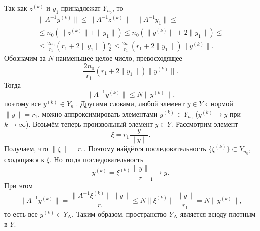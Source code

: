 \documentclass[12pt,a4paper, titlepage]{article}
\begin{document}
Так как $z^{(k)}$ и $y_1$ принадлежат $Y_{n_0}$, то
\begin{multline*}
\|A^{-1} y^{(k)}\| \leqslant \|A^{-1} z^{(k)}\| + \|A^{-1} y_1\| \leqslant \\
\leqslant n_0(\|z^{(k)}\| + \|y_1\|) \leqslant n_0(\|y^{(k)}\| + 2\|y_1\|) \leqslant \\
\leqslant \frac {2n_0} {r_1} (r_1 + 2\|y_1\|) \frac {r_1} 2 \leqslant \frac {2n_0} {r_1} (r_1 + 2 \|y_1\|) \|y^{(k)}\|.
\end{multline*}
Обозначим за $N$ наименьшее целое число, превосходящее
$$
\frac {2n_0} {r_1} (r_1 + 2 \|y_1\|) \|y^{(k)}\|.
$$
Тогда
$$
\|A^{-1} y^{(k)}\| \leqslant N \|y^{(k)}\|,
$$
поэтому все $y^{(k)} \in Y_{n_0}$. Другими словами, любой элемент $y \in Y$ с нормой $\|y\| = r_1$, можно аппроксимировать элементами $y^{(k)} \in Y_{n_0}$ ($y^{(k)} \to y$ при $k \to \infty$). Возьмём теперь произвольный элемент $y \in Y$. Рассмотрим элемент
$$
\xi = r_1 \frac y {\|y\|}.
$$
Получаем, что $\|\xi\| = r_1$. Поэтому найдётся последовательность $\lbrace \xi^{(k)} \rbrace \subset Y_{n_0}$, сходящаяся к $\xi$. Но тогда последовательность
$$
y^{(k)} = \xi^{(k)} \frac {\|y\|} r_1 \to y.
$$
При этом
$$
\|A^{-1} y^{(k)}\| = \frac{\|A^{-1} \xi^{(k)}\| \|y\|}{r_1} \leqslant N \|\xi^{(k)}\| \frac{\|y\|}{r_1} = N \|y^{(k)}\|,
$$
то есть все $y^{(k)} \in Y_N$. Таким образом, пространство $Y_N$ является всюду плотным в $Y$.\\
\end{document}
